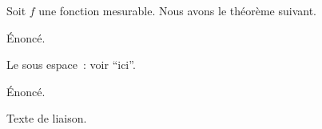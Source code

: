 Soit $f$ une fonction mesurable. Nous avons le théorème suivant.
\begin{theorem}
  Énoncé.
\end{theorem}

\begin{proposition}
  Le sous espace~: voir ``ici''.
\end{proposition} %

\begin{definition}
  Énoncé.
\end{definition}
Texte de liaison. %
